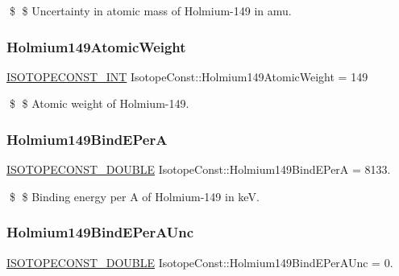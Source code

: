 \$ \$ Uncertainty in atomic mass of Holmium-\/149 in amu. \mbox{\label{group___isotope_const-_holmium-_ho149_gaeeb0ce6e82e6f8a6c0550971b2ffb660}} 
\subsubsection{\texorpdfstring{Holmium149\+Atomic\+Weight}{Holmium149AtomicWeight}}
{\footnotesize\ttfamily \mbox{\hyperlink{group___isotope_const-_macros_ga5f18360b3e99483a35c32d789e62621c}{I\+S\+O\+T\+O\+P\+E\+C\+O\+N\+S\+T\+\_\+\+I\+NT}} Isotope\+Const\+::\+Holmium149\+Atomic\+Weight = 149}

\$ \$ Atomic weight of Holmium-\/149. \mbox{\label{group___isotope_const-_holmium-_ho149_ga6f7b90297bd87c1de65c0d69d255fa24}} 
\subsubsection{\texorpdfstring{Holmium149\+Bind\+E\+PerA}{Holmium149BindEPerA}}
{\footnotesize\ttfamily \mbox{\hyperlink{group___isotope_const-_macros_ga8f45a7272ce02c0b4c65c44636ed719a}{I\+S\+O\+T\+O\+P\+E\+C\+O\+N\+S\+T\+\_\+\+D\+O\+U\+B\+LE}} Isotope\+Const\+::\+Holmium149\+Bind\+E\+PerA = 8133.}

\$ \$ Binding energy per A of Holmium-\/149 in keV. \mbox{\label{group___isotope_const-_holmium-_ho149_ga5d789c477dd9cf1029de4ab664203dce}} 
\subsubsection{\texorpdfstring{Holmium149\+Bind\+E\+Per\+A\+Unc}{Holmium149BindEPerAUnc}}
{\footnotesize\ttfamily \mbox{\hyperlink{group___isotope_const-_macros_ga8f45a7272ce02c0b4c65c44636ed719a}{I\+S\+O\+T\+O\+P\+E\+C\+O\+N\+S\+T\+\_\+\+D\+O\+U\+B\+LE}} Isotope\+Const\+::\+Holmium149\+Bind\+E\+Per\+A\+Unc = 0.}

